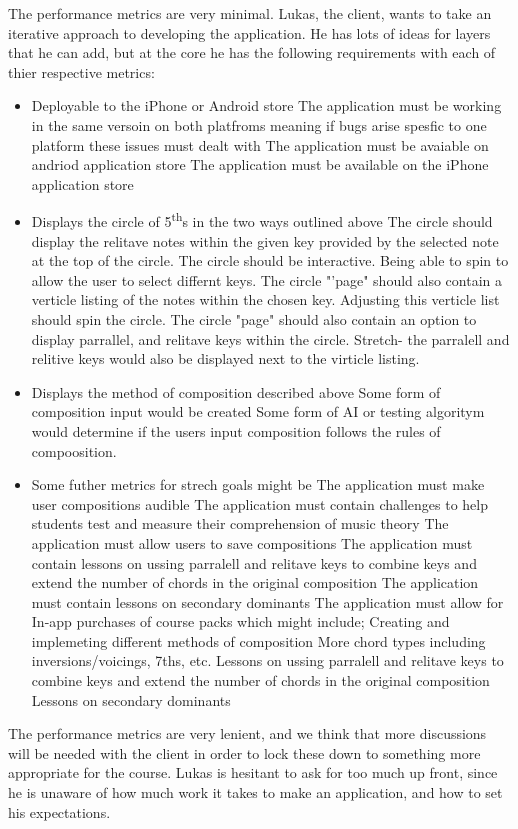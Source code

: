 \documentclass[onecolumn, draftclsnofoot,10pt, compsoc]{IEEEtran}
\begin{document}
    The performance metrics are very minimal.
    Lukas, the client, wants to take an iterative approach to developing the application.
    He has lots of ideas for layers that he can add, but at the core he has the following requirements with each of thier respective metrics:
    \begin{itemize}
    \item Deployable to the iPhone or Android store
	\subitem The application must be working in the same versoin on both platfroms meaning if bugs arise spesfic to one platform these issues must dealt with
	\subitem The application must be avaiable on andriod application store
	\subitem The application must be available on the iPhone application store 
    \item Displays the circle of 5\textsuperscript{th}s in the two ways outlined above
	\subitem The circle should display the relitave notes within the given key provided by the selected note at the top of the circle.
	\subitem The circle should be interactive. Being able to spin to allow the user to select differnt keys.
	\subitem The circle "'page" should also contain a verticle listing of the notes within the chosen key.
	\subitem Adjusting this verticle list should spin the circle.
	\subitem The circle "page" should also contain an option to display parrallel, and relitave keys within the circle.
		\subitem Stretch- the parralell and relitive keys would also be displayed next to the virticle listing.
    \item Displays the method of composition described above
	\subitem Some form of composition input would be created
	\subitem Some form of AI or testing algoritym would determine if the users input composition follows the rules of compoosition.
   \item Some futher metrics for strech goals might be
	\subitem The application must make user compositions audible
	\subitem The application must contain challenges to help students test and measure their comprehension of music theory
    	\subitem The application must allow users to save compositions
    	\subitem The application must contain lessons on ussing parralell and relitave keys to combine keys and extend the number of chords in the original composition
    	\subitem The application must contain lessons on secondary dominants
	\subitem The application must allow for In-app purchases of course packs which might include;
		\subitem Creating and implemeting different methods of composition
		\subitem More chord types including inversions/voicings, 7ths, etc.
		\subitem Lessons on ussing parralell and relitave keys to combine keys and extend the number of chords in the original composition
    		\subitem Lessons on secondary dominants

    \end {itemize}
    
    \par
    The performance metrics are very lenient, and we think that more discussions will be needed with the client in order to lock these down to something more appropriate for the course.
    Lukas is hesitant to ask for too much up front, since he is unaware of how much work it takes to make an application, and how to set his expectations.
    
    
    
\end{document}
